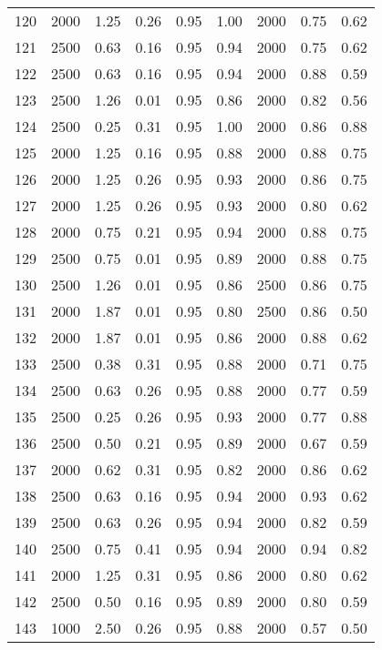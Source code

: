 \begin{longtable}[c]{ccccccccc}
120 &  2000 &  1.25 &  0.26 &  0.95 &  1.00 &  2000 &  0.75 &  0.62 \\
121 &  2500 &  0.63 &  0.16 &  0.95 &  0.94 &  2000 &  0.75 &  0.62 \\
122 &  2500 &  0.63 &  0.16 &  0.95 &  0.94 &  2000 &  0.88 &  0.59 \\
123 &  2500 &  1.26 &  0.01 &  0.95 &  0.86 &  2000 &  0.82 &  0.56 \\
124 &  2500 &  0.25 &  0.31 &  0.95 &  1.00 &  2000 &  0.86 &  0.88 \\
125 &  2000 &  1.25 &  0.16 &  0.95 &  0.88 &  2000 &  0.88 &  0.75 \\
126 &  2000 &  1.25 &  0.26 &  0.95 &  0.93 &  2000 &  0.86 &  0.75 \\
127 &  2000 &  1.25 &  0.26 &  0.95 &  0.93 &  2000 &  0.80 &  0.62 \\
128 &  2000 &  0.75 &  0.21 &  0.95 &  0.94 &  2000 &  0.88 &  0.75 \\
129 &  2500 &  0.75 &  0.01 &  0.95 &  0.89 &  2000 &  0.88 &  0.75 \\
130 &  2500 &  1.26 &  0.01 &  0.95 &  0.86 &  2500 &  0.86 &  0.75 \\
131 &  2000 &  1.87 &  0.01 &  0.95 &  0.80 &  2500 &  0.86 &  0.50 \\
132 &  2000 &  1.87 &  0.01 &  0.95 &  0.86 &  2000 &  0.88 &  0.62 \\
133 &  2500 &  0.38 &  0.31 &  0.95 &  0.88 &  2000 &  0.71 &  0.75 \\
134 &  2500 &  0.63 &  0.26 &  0.95 &  0.88 &  2000 &  0.77 &  0.59 \\
135 &  2500 &  0.25 &  0.26 &  0.95 &  0.93 &  2000 &  0.77 &  0.88 \\
136 &  2500 &  0.50 &  0.21 &  0.95 &  0.89 &  2000 &  0.67 &  0.59 \\
137 &  2000 &  0.62 &  0.31 &  0.95 &  0.82 &  2000 &  0.86 &  0.62 \\
138 &  2500 &  0.63 &  0.16 &  0.95 &  0.94 &  2000 &  0.93 &  0.62 \\
139 &  2500 &  0.63 &  0.26 &  0.95 &  0.94 &  2000 &  0.82 &  0.59 \\
140 &  2500 &  0.75 &  0.41 &  0.95 &  0.94 &  2000 &  0.94 &  0.82 \\
141 &  2000 &  1.25 &  0.31 &  0.95 &  0.86 &  2000 &  0.80 &  0.62 \\
142 &  2500 &  0.50 &  0.16 &  0.95 &  0.89 &  2000 &  0.80 &  0.59 \\
143 &  1000 &  2.50 &  0.26 &  0.95 &  0.88 &  2000 &  0.57 &  0.50 \\

\end{longtable}
